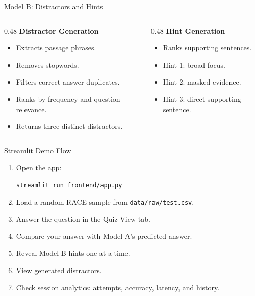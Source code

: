 \documentclass[aspectratio=169,11pt]{beamer}
\begin{document}
\begin{frame}{Model B: Distractors and Hints}
    \begin{columns}
        \begin{column}{0.48\linewidth}
            \textbf{Distractor Generation}
            \begin{itemize}
                \item Extracts passage phrases.
                \item Removes stopwords.
                \item Filters correct-answer duplicates.
                \item Ranks by frequency and question relevance.
                \item Returns three distinct distractors.
            \end{itemize}
        \end{column}
        \begin{column}{0.48\linewidth}
            \textbf{Hint Generation}
            \begin{itemize}
                \item Ranks supporting sentences.
                \item Hint 1: broad focus.
                \item Hint 2: masked evidence.
                \item Hint 3: direct supporting sentence.
            \end{itemize}
        \end{column}
    \end{columns}
\end{frame}

\begin{frame}{Streamlit Demo Flow}
    \begin{enumerate}
        \item Open the app:
        \begin{center}
            \texttt{streamlit run frontend/app.py}
        \end{center}
        \item Load a random RACE sample from \texttt{data/raw/test.csv}.
        \item Answer the question in the Quiz View tab.
        \item Compare your answer with Model A's predicted answer.
        \item Reveal Model B hints one at a time.
        \item View generated distractors.
        \item Check session analytics: attempts, accuracy, latency, and history.
    \end{enumerate}
\end{frame}
\end{document}
